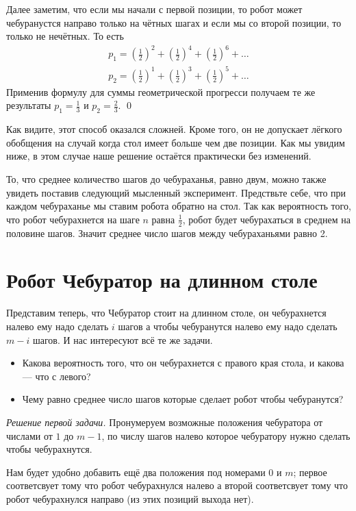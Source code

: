 \documentclass{article}
\begin{document}
Далее заметим, что если мы начали с первой позиции, 
то робот может чебуранустся направо только на чётных шагах 
и если мы со второй позиции, 
то только не нечётных.
То есть
\begin{align*}
p_1=(\tfrac12)^2+(\tfrac12)^4+(\tfrac12)^6+\dots
\\
p_2=(\tfrac12)^1+(\tfrac12)^3+(\tfrac12)^5+\dots
\end{align*}
Применив формулу для суммы геометрической прогресси получаем те же результаты $p_1=\tfrac13$ и $p_2=\tfrac23$.
\qed
\medskip

Как видите, этот способ оказался сложней.
Кроме того, он не допускает лёгкого обобщения на случай когда стол имеет больше чем две позиции.
Как мы увидим ниже, 
в этом случае наше решение остаётся практически без изменений.

То, что среднее количество шагов до чебураханья,
равно двум, можно также увидеть поставив следующий мысленный эксперимент.
Предствьте себе, что при каждом чебураханье 
мы ставим робота обратно на стол.
Так как вероятность того, что робот чебурахнется на шаге $n$
равна $\tfrac12$, робот будет чебурахаться в среднем на половине шагов.
Значит среднее число шагов между чебураханьями равно 2.


\section{Робот Чебуратор на длинном столе} 

Представим теперь, что Чебуратор стоит на длинном столе,
он чебурахнется налево ему надо сделать $i$ шагов
а чтобы чебуранутся налево ему надо сделать $m-i$ шагов.
И нас интересуют всё те же задачи.

\begin{itemize}
\item Какова вероятность того, что он чебурахнется с правого края стола, и какова --- что с левого?
\item Чему равно среднее число шагов которые сделает робот чтобы чебуранутся?
\end{itemize}

\medskip
\noindent\textit{Решение первой задачи.}
Пронумеруем возможные положения чебуратора от числами от $1$ до $m-1$,
по числу шагов налево которое чебуратору нужно сделать чтобы чебурахнутся.

Нам будет удобно добавить ещё два положения под номерами $0$ и $m$;
первое соответсвует тому что робот чебурахнулся налево 
а второй соответсвует тому что робот чебурахнулся направо
(из этих позиций выхода нет).
\end{document}
